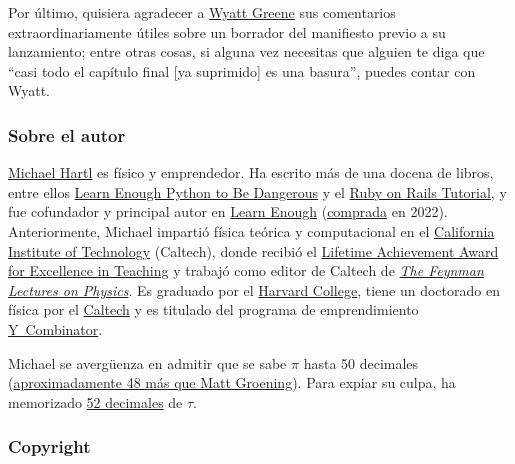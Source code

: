 Por último, quisiera agradecer a \href{http://techiferous.com/about}{Wyatt Greene} sus comentarios extraordinariamente útiles sobre un borrador del manifiesto previo a su lanzamiento; entre otras cosas, si alguna vez necesitas que alguien te diga que ``casi todo el capítulo final [ya suprimido] es una basura'', puedes contar con Wyatt.



    \renewcommand{\thesubsubsection}{6.2831}

    \subsubsection{Sobre el autor} %
    \label{sec:about_the_author}


\href{http://www.michaelhartl.com/}{Michael Hartl} es físico y emprendedor. Ha escrito más de una docena de libros, entre ellos \href{https://www.learnenough.com/python}{Learn Enough Python to Be Dangerous} y el \href{https://www.railstutorial.org/}{Ruby on Rails Tutorial}, y fue cofundador y principal autor en \href{https://www.learnenough.com/}{Learn Enough} (\href{https://news.learnenough.com/big-news-about-learn-enough}{comprada} en 2022). Anteriormente, Michael impartió física teórica y computacional en el \href{http://www.caltech.edu/}{California Institute of Technology} (Caltech), donde recibió el \href{https://www.michaelhartl.com/ascit/awards2000.html}{Lifetime Achievement Award for Excellence in Teaching} y trabajó como editor de Caltech de \href{http://www.feynmanlectures.caltech.edu/}{\emph{The Feynman Lectures on Physics}}. Es graduado por el \href{http://college.harvard.edu/}{Harvard College}, tiene un doctorado en física por el \href{http://www.caltech.edu/}{Caltech} y es titulado del programa de emprendimiento \href{http://ycombinator.com/}{Y~Combinator}.

Michael se avergüenza en admitir que se sabe $\pi$ hasta 50 decimales (\href{\#fig-futurama_video}{aproximadamente 48 más que Matt Groening}). Para expiar su culpa, ha memorizado \href{http://www.wolframalpha.com/input/?i=N[2+Pi,+53]}{52 decimales} de $\tau$.

\renewcommand{\thesubsubsection}{6.28318}

    \subsubsection{Copyright} %
    \label{sec:copyright_and_license}

